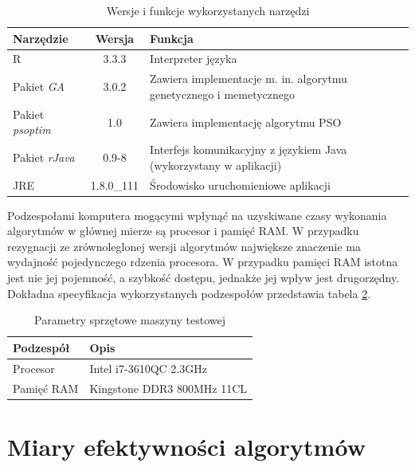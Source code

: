 \begin{table}[hb]
\label{table:wykorzystane_narzedzia}
\caption{Wersje i funkcje wykorzystanych narzędzi}
\begin{tabularx}{\textwidth}{|l|c|X|}
	\hline
	Narzędzie & Wersja & Funkcja \\
	\hline
	R & 3.3.3 & Interpreter języka \\
	Pakiet \emph{GA} & 3.0.2 & Zawiera implementacje m. in. algorytmu genetycznego i memetycznego \\
	Pakiet \emph{psoptim} & 1.0 & Zawiera implementację algorytmu PSO \\
	Pakiet \emph{rJava} & 0.9-8 & Interfejs komunikacyjny z językiem Java (wykorzystany w aplikacji) \\
	JRE & 1.8.0\_111 & Środowisko uruchomieniowe aplikacji \\
	\hline
	\end{tabularx}
\end{table}
\par
Podzespołami komputera mogącymi wpłynąć na uzyskiwane czasy wykonania algorytmów w głównej mierze są procesor i pamięć RAM. W przypadku rezygnacji ze zrównoleglonej wersji algorytmów największe znaczenie ma wydajność pojedynczego rdzenia procesora. W przypadku pamięci RAM istotna jest nie jej pojemność, a szybkość dostępu, jednakże jej wpływ jest drugorzędny. Dokładna specyfikacja wykorzystanych podzespołów przedstawia tabela \ref{table:parametry_komputera}.
\begin{table}[hb]
\caption{Parametry sprzętowe maszyny testowej}
\label{table:parametry_komputera}
\begin{center}
\begin{tabular}{|l|l|}
	\hline
	Podzespół & Opis \\
	\hline
	Procesor & Intel i7-3610QC 2.3GHz \\
	Pamięć RAM & Kingstone DDR3 800MHz 11CL \\
	\hline
	\end{tabular}
\end{center}
\end{table}



\section{Miary efektywności algorytmów}
\label{sec:przyjete_miary_efektywnosci_algorytmow}

